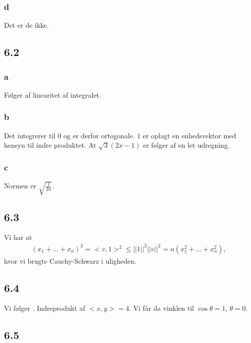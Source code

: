 			\subsubsection{d}

				Det er de ikke.

		\subsection{6.2}

			\subsubsection{a}

				Følger af linearitet af integralet.

			\subsubsection{b}

				Det integrerer til $0$ og er derfor ortogonale. $1$ er oplagt en enhedsvektor med hensyn til indre produktet. At $\sqrt{3}(2x-1)$ er følger af en let udregning. 

			\subsubsection{c}

				Normen er $\sqrt{\frac{1}{2n}}$.

		\subsection{6.3}

			Vi har at 
				\begin{align*}
					(x_1+\ldots+x_n)^2=<v,1>^2\leq ||1||^2||v||^2=n(x_1^2+\ldots+x_n^2),
				\end{align*} 
			hvor vi brugte Cauchy-Schwarz i uligheden.

		\subsection{6.4}

			Vi følger \cite[Eksempel 6.1.6]{hesselholt2017}. Indreprodukt af $<x,y>=4$. Vi får da vinklen til $\cos \theta =1$, $\theta =0$.

		\subsection{6.5}

